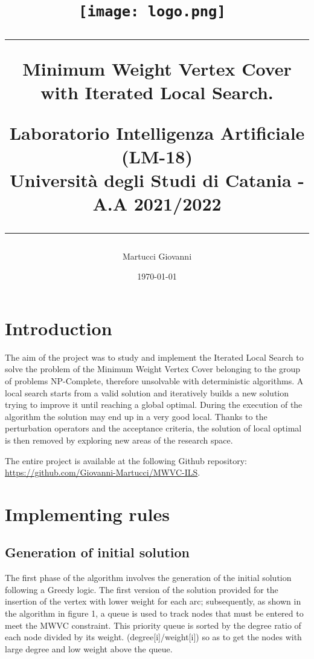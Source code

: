 \documentclass[11pt, oneside]{article}
\title{ %
\texttt{[image: logo.png]}~\\

\qquad


\noindent\rule{17cm}{0.4pt}

\qquad

Minimum Weight Vertex Cover with Iterated Local Search. \\ 

\qquad

\qquad

\large Laboratorio Intelligenza Artificiale (LM-18) \\ Università degli Studi di Catania - A.A 2021/2022 \\

\qquad

\qquad

\noindent\rule{17cm}{0.4pt}

\qquad

\qquad

}
\author{ Martucci Giovanni}
\date{\today}
\begin{document}
\maketitle	


\pagebreak



\section{Introduction}

The aim of the project was to study and implement the Iterated Local Search to solve the problem of the Minimum Weight Vertex Cover belonging to the group of problems NP-Complete, therefore unsolvable with deterministic algorithms. A local search starts from a valid solution and iteratively builds a new solution trying to improve it until reaching a global optimal. During the execution of the algorithm the solution may end up in a very good local. Thanks to the perturbation operators and the acceptance criteria, the solution of local optimal is then removed by exploring new areas of the research space. 

\qquad
\qquad 

The entire project is available at the following Github repository:  \href{https://github.com/Giovanni-Martucci/MWVC_ILS}{https://github.com/Giovanni-Martucci/MWVC-ILS}.

\qquad

\qquad

\qquad

\section{Implementing rules}

\qquad

\qquad

\subsection{Generation of initial solution}
The first phase of the algorithm involves the generation of the initial solution following a Greedy logic. The first version of the solution provided for the insertion of the vertex with lower weight for each arc; subsequently, as shown in the algorithm in figure 1, a queue is used to track nodes that must be entered to meet the MWVC constraint. This priority queue is sorted by the degree ratio of each node divided by its weight. (degree[i]/weight[i]) so as to get the nodes with large degree and low weight above the queue.
\qquad
\end{document}
